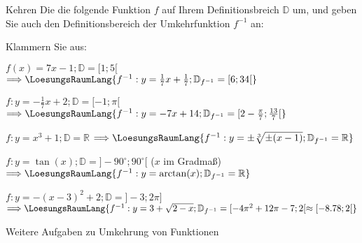 

\renewcommand{\bbwAufgabenBlockID}{Finv}

\renewcommand{\metaHeaderLine}{Umkehrfunktionen}
\renewcommand{\arbeitsblattTitel}{Funktionen}



Kehren Die die folgende Funktion $f$ auf Ihrem Definitionsbreich
$\mathbb{D}$ um, und geben Sie auch den Definitionsbereich der
Umkehrfunktion $f^{-1}$ an:

Klammern Sie aus:
\begin{bbwAufgabenBlock}
\item $f(x) = 7x-1; \mathbb{D} = [1;5[$
$\Longrightarrow \LoesungsRaumLang{
f^{-1}: y=\frac17 x + \frac17; \mathbb{D}_{f^{-1}} = [6;34[
}$

\item $f:  y = -\frac17x + 2; \mathbb{D} = [-1;\pi[$
$\Longrightarrow \LoesungsRaumLang{
f^{-1}: y=-7x+14; \mathbb{D}_{f^{-1}} = [2-\frac{\pi}{7};\frac{13}{7}[
}$

\item $f:  y = x^3  + 1; \mathbb{D} = \mathbb{R}$
$\Longrightarrow \LoesungsRaumLang{
f^{-1}: y=\pm\sqrt[3]{\pm(x-1)}; \mathbb{D}_{f^{-1}} = \mathbb{R}
}$

\item $f:  y = \tan(x); \mathbb{D} = ]-90^{\circ};90^{\circ}[$ ($x$ im Gradmaß)
$\Longrightarrow \LoesungsRaumLang{
f^{-1}: y=\arctan(x); \mathbb{D}_{f^{-1}} = \mathbb{R}
}$

\item $f:  y = -(x-3)^2 + 2; \mathbb{D} = ]-3;2\pi]$
$\Longrightarrow \LoesungsRaumLang{
f^{-1}: y=3+\sqrt{2-x}; \mathbb{D}_{f^{-1}} = [-4\pi^2+12\pi-7;2[
\approx{} [-8.78;2[
}$

\end{bbwAufgabenBlock}

\platzFuerBerechnungenBisEndeSeite{}



Weitere Aufgaben zu Umkehrung von Funktionen

